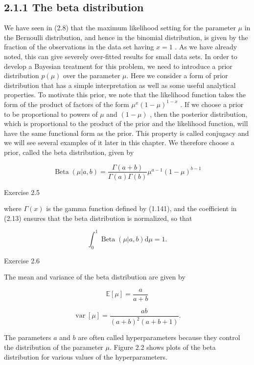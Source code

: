 \documentclass[
  10
]{article}
\begin{document}
\subsection{2.1.1 The beta distribution}\label{the-beta-distribution}

We have seen in (2.8) that the maximum likelihood setting for the
parameter \(\mu\) in the Bernoulli distribution, and hence in the
binomial distribution, is given by the fraction of the observations in
the data set having \(x = 1\) . As we have already noted, this can give
severely over-fitted results for small data sets. In order to develop a
Bayesian treatment for this problem, we need to introduce a prior
distribution \(p ( \mu )\) over the parameter \(\mu .\) Here we consider
a form of prior distribution that has a simple interpretation as well as
some useful analytical properties. To motivate this prior, we note that
the likelihood function takes the form of the product of factors of the
form \(\mu ^ { x } ( 1 - \mu ) ^ { 1 - x }\) . If we choose a prior to
be proportional to powers of \(\mu\) and \(( 1 - \mu )\) , then the
posterior distribution, which is proportional to the product of the
prior and the likelihood function, will have the same functional form as
the prior. This property is called conjugacy and we will see several
examples of it later in this chapter. We therefore choose a prior,
called the beta distribution, given by

\[
\operatorname{Beta} (\mu | a, b) = \frac {\Gamma (a + b)}{\Gamma (a) \Gamma (b)} \mu^ {a - 1} (1 - \mu) ^ {b - 1}\tag{2.13}
\]

Exercise 2.5

where \(\Gamma ( x )\) is the gamma function defined by (1.141), and the
coefficient in (2.13) ensures that the beta distribution is normalized,
so that

\[
\int_ {0} ^ {1} \operatorname{Beta} (\mu | a, b) \mathrm{d} \mu = 1.\tag{2.14}
\]

Exercise 2.6

The mean and variance of the beta distribution are given by

\[
\mathbb {E} [ \mu ] = \frac {a}{a + b}\tag{2.15}
\]

\[
\operatorname{var} [ \mu ] = \frac {a b}{(a + b) ^ {2} (a + b + 1)}.\tag{2.16}
\]

The parameters \(a\) and \(b\) are often called hyperparameters because
they control the distribution of the parameter \(\mu .\) Figure 2.2
shows plots of the beta distribution for various values of the
hyperparameters.
\end{document}
